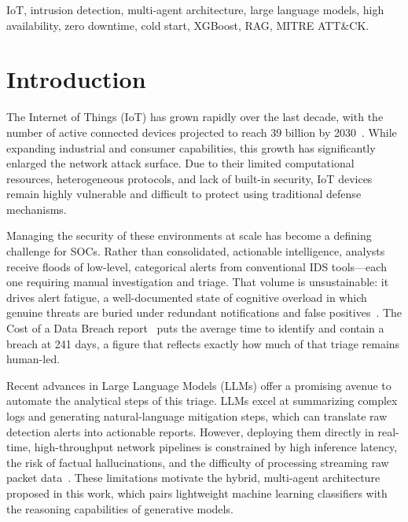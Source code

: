 \documentclass[conference]{IEEEtran}
\begin{document}
\vspace{0.5cm}

\begin{IEEEkeywords}
    IoT, intrusion detection, multi-agent architecture, large language models, high availability, zero downtime, cold start, XGBoost, RAG, MITRE ATT\&CK.
\end{IEEEkeywords}

\section{Introduction}
\label{sec:intro}

The Internet of Things (IoT) has grown rapidly over the last decade, with the number of active connected devices projected to reach 39 billion by 2030~\cite{iotanalytics2023}. While expanding industrial and consumer capabilities, this growth has significantly enlarged the network attack surface. Due to their limited computational resources, heterogeneous protocols, and lack of built-in security, IoT devices remain highly vulnerable and difficult to protect using traditional defense mechanisms.

Managing the security of these environments at scale has become a defining challenge for SOCs. Rather than consolidated, actionable intelligence, analysts receive floods of low-level, categorical alerts from conventional IDS tools---each one requiring manual investigation and triage. That volume is unsustainable: it drives alert fatigue, a well-documented state of cognitive overload in which genuine threats are buried under redundant notifications and false positives~\cite{paloalto2024alertfatigue}. The Cost of a Data Breach report~\cite{ibm2025cost} puts the average time to identify and contain a breach at 241 days, a figure that reflects exactly how much of that triage remains human-led.

Recent advances in Large Language Models (LLMs) offer a promising avenue to automate the analytical steps of this triage. LLMs excel at summarizing complex logs and generating natural-language mitigation steps, which can translate raw detection alerts into actionable reports. However, deploying them directly in real-time, high-throughput network pipelines is constrained by high inference latency, the risk of factual hallucinations, and the difficulty of processing streaming raw packet data~\cite{zhang2025llms}. These limitations motivate the hybrid, multi-agent architecture proposed in this work, which pairs lightweight machine learning classifiers with the reasoning capabilities of generative models.
\end{document}
